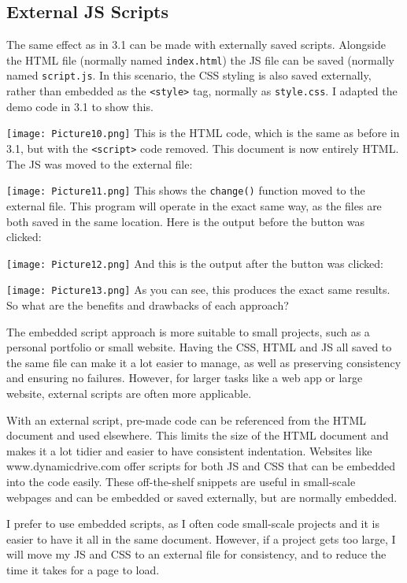 \documentclass[a4paper]{article}
\begin{document}
\subsection{External JS Scripts}
The same effect as in 3.1 can be made with externally saved scripts. Alongside the HTML file (normally named \verb|index.html|) the JS file can be saved (normally named \verb|script.js|. In this scenario, the CSS styling is also saved externally, rather than embedded as the \verb|<style>| tag, normally as \verb|style.css|. I adapted the demo code in 3.1 to show this. \par
\noindent\texttt{[image: Picture10.png]}
This is the HTML code, which is the same as before in 3.1, but with the \verb|<script>| code removed. This document is now entirely HTML. The JS was moved to the external file: \par
\noindent\texttt{[image: Picture11.png]}
This shows the \verb|change()| function moved to the external file. This program will operate in the exact same way, as the files are both saved in the same location. Here is the output before the button was clicked: \par
\noindent\texttt{[image: Picture12.png]} 
And this is the output after the button was clicked: \par
\noindent\texttt{[image: Picture13.png]} 
As you can see, this produces the exact same results. So what are the benefits and drawbacks of each approach? \par \par
The embedded script approach is more suitable to small projects, such as a personal portfolio or small website. Having the CSS, HTML and JS all saved to the same file can make it a lot easier to manage, as well as preserving consistency and ensuring no failures. However, for larger tasks like a web app or large website, external scripts are often more applicable. \par
With an external script, pre-made code can be referenced from the HTML document and used elsewhere. This limits the size of the HTML document and makes it a lot tidier and easier to have consistent indentation. Websites like www.dynamicdrive.com offer scripts for both JS and CSS that can be embedded into the code easily. These off-the-shelf snippets are useful in small-scale webpages and can be embedded or saved externally, but are normally embedded. \par
I prefer to use embedded scripts, as I often code small-scale projects and it is easier to have it all in the same document. However, if a project gets too large, I will move my JS and CSS to an external file for consistency, and to reduce the time it takes for a page to load.
\end{document}
